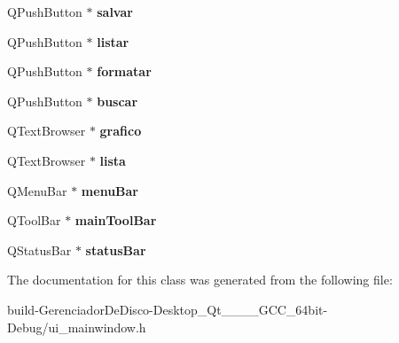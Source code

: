 \begin{DoxyCompactItemize}
\item 
\hypertarget{classUi__MainWindow_a923071e00862edfd4b7dae1acfa2ce72}{}Q\+Push\+Button $\ast$ {\bfseries salvar}\label{classUi__MainWindow_a923071e00862edfd4b7dae1acfa2ce72}

\item 
\hypertarget{classUi__MainWindow_a1a6dc24545f27bd86e948aea1f968336}{}Q\+Push\+Button $\ast$ {\bfseries listar}\label{classUi__MainWindow_a1a6dc24545f27bd86e948aea1f968336}

\item 
\hypertarget{classUi__MainWindow_ab5edaf931c456221366ab8b2680a983e}{}Q\+Push\+Button $\ast$ {\bfseries formatar}\label{classUi__MainWindow_ab5edaf931c456221366ab8b2680a983e}

\item 
\hypertarget{classUi__MainWindow_a1597346a152c37a0fcd697db06771a0a}{}Q\+Push\+Button $\ast$ {\bfseries buscar}\label{classUi__MainWindow_a1597346a152c37a0fcd697db06771a0a}

\item 
\hypertarget{classUi__MainWindow_afd6631fbb0b169e83b16f1ac59d65ad5}{}Q\+Text\+Browser $\ast$ {\bfseries grafico}\label{classUi__MainWindow_afd6631fbb0b169e83b16f1ac59d65ad5}

\item 
\hypertarget{classUi__MainWindow_a98cd045ec752a28ac23816806cceb982}{}Q\+Text\+Browser $\ast$ {\bfseries lista}\label{classUi__MainWindow_a98cd045ec752a28ac23816806cceb982}

\item 
\hypertarget{classUi__MainWindow_a502a50d7dc22415f511336bdfb4318b9}{}Q\+Menu\+Bar $\ast$ {\bfseries menu\+Bar}\label{classUi__MainWindow_a502a50d7dc22415f511336bdfb4318b9}

\item 
\hypertarget{classUi__MainWindow_abca26371605d7c5235fab5188d4bdcf7}{}Q\+Tool\+Bar $\ast$ {\bfseries main\+Tool\+Bar}\label{classUi__MainWindow_abca26371605d7c5235fab5188d4bdcf7}

\item 
\hypertarget{classUi__MainWindow_afa919f3af6f2f526a70f1fa331f63724}{}Q\+Status\+Bar $\ast$ {\bfseries status\+Bar}\label{classUi__MainWindow_afa919f3af6f2f526a70f1fa331f63724}

\end{DoxyCompactItemize}


The documentation for this class was generated from the following file\+:\begin{DoxyCompactItemize}
\item 
build-\/\+Gerenciador\+De\+Disco-\/\+Desktop\+\_\+\+Qt\+\_\+\_\+\_\+\_\+\+G\+C\+C\+\_\+64bit-\/\+Debug/ui\+\_\+mainwindow.\+h\end{DoxyCompactItemize}
